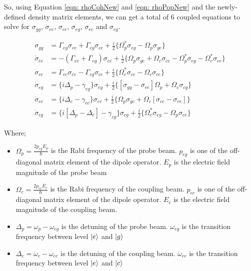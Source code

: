 \newpage

So, using Equation \ref{eqn: rhoCohNew} and \ref{eqn: rhoPopNew} and the newly-defined density matrix elements, we can get a total of $6$ coupled equations to solve for $\sigma_{gg}$, $\sigma_{ee}$, $\sigma_{cc}$, $\sigma_{eg}$, $\sigma_{ec}$ and $\sigma_{cg}$.

\begin{align}
    \Dot{\sigma}_{gg} &= \Gamma_{eg} \sigma_{ee} + \Gamma_{cg} \sigma_{cc} + \frac{i}{2} \{\Omega_{p}^{*} \sigma_{eg} - \Omega_{p} \sigma_{ge}\} \label{eqn: 1st}\\
    \Dot{\sigma}_{ee} &= -(\Gamma_{ec} + \Gamma_{eg}) \sigma_{ee} + \frac{i}{2} \{\Omega_{p} \sigma_{ge} + \Omega_{c} \sigma_{ce} - \Omega_{p}^{*} \sigma_{eg} - \Omega_{c}^{*} \sigma_{ec}\}\\
    \Dot{\sigma}_{cc} &= \Gamma_{ec} \sigma_{ee} - \Gamma_{cg} \sigma_{cc} + \frac{i}{2} \{\Omega_{c}^{*} \sigma_{ec} - \Omega_{c} \sigma_{ce}\}\\
    \Dot{\sigma}_{eg} &= \{i \Delta_{p} - \gamma_{eg}\}\sigma_{eg} + \frac{i}{2} \{[\sigma_{gg} - \sigma_{ee}] \Omega_{p} + \Omega_{c} \sigma_{cg}\}\\
    \Dot{\sigma}_{ec} &= \{i \Delta_{c} - \gamma_{ec}\} \sigma_{ec} + \frac{i}{2} \{\Omega_{p} \sigma_{gc} + \Omega_{c} [\sigma_{cc} - \sigma_{ee}]\}\\
    \Dot{\sigma}_{cg} &= \{i[\Delta_{p} - \Delta_{c}] - \gamma_{cg}\}\sigma_{cg} + \frac{i}{2} \{\Omega_{c}^{*} \sigma_{eg} - \Omega_{p} \sigma_{ce}\} \label{eqn: final}
\end{align}

Where;

\begin{itemize}
    \item $\Omega_{p} = \frac{2 p_{eg} E_{p}}{\hbar}$ is the Rabi frequency of the probe beam. $p_{eg}$ is one of the off-diagonal matrix element of the dipole operator. $E_{p}$ is the electric field magnitude of the probe beam
    \item $\Omega_{c} = \frac{2 p_{ec} E_{c}}{\hbar}$ is the Rabi frequency of the coupling beam. $p_{ec}$ is one of the off-diagonal matrix element of the dipole operator. $E_{c}$ is the electric field magnitude of the coupling beam.
    \item $\Delta_{p} = \omega_{p} - \omega_{eg}$ is the detuning of the probe beam. $\omega_{eg}$ is the transition frequency between level $\ket{e}$ and $\ket{g}$
    \item $\Delta_{c} = \omega_{c} - \omega_{ec}$ is the detuning of the coupling beam. $\omega_{ec}$ is the transition frequency between level $\ket{e}$ and $\ket{c}$
\end{itemize}

